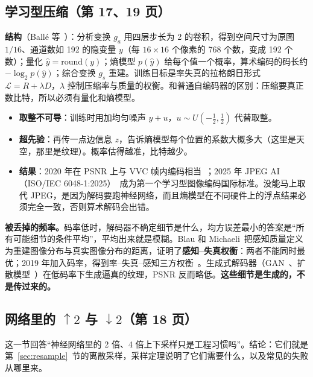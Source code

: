 \subsection{学习型压缩（第 17、19 页）}\label{sec:learned}
\textbf{结构}（Ballé 等~\cite{balle2017,balle2018}）：分析变换 $g_a$ 用四层步长为 2 的卷积，得到空间尺寸为原图 $1/16$、通道数如 192 的隐变量 $y$（每 $16\times16$ 个像素的 768 个数，变成 192 个数）；量化 $\hat y=\mathrm{round}(y)$；熵模型 $p(\hat y)$ 给每个值一个概率，算术编码的码长约 $-\log_2p(\hat y)$；综合变换 $g_s$ 重建。训练目标是率失真的拉格朗日形式 $\mathcal L=R+\lambda D$，$\lambda$ 控制压缩率与质量的权衡。和普通自编码器的区别：压缩要真正数比特，所以必须有量化和熵模型。
\begin{itemize}
  \item \textbf{取整不可导}：训练时用加均匀噪声 $y+u$，$u\sim U(-\tfrac12,\tfrac12)$ 代替取整。
  \item \textbf{超先验}：再传一点边信息 $z$，告诉熵模型每个位置的系数大概多大（这里是天空，那里是纹理）。概率估得越准，比特越少。
  \item \textbf{结果}：2020 年在 PSNR 上与 VVC 帧内编码相当~\cite{cheng2020}；2025 年 JPEG AI（ISO/IEC 6048-1:2025）~\cite{jpegai2025}成为第一个学习型图像编码国际标准。没能马上取代 JPEG，是因为解码要跑神经网络，而且熵模型在不同硬件上的浮点结果必须完全一致，否则算术解码会出错。
\end{itemize}

\textbf{被丢掉的频率。}码率低时，解码器不确定细节是什么，均方误差最小的答案是“所有可能细节的条件平均”，平均出来就是模糊。Blau 和 Michaeli~\cite{blau2018}把感知质量定义为重建图像分布与真实图像分布的距离，证明了\textbf{感知--失真权衡}：两者不能同时最优；2019 年加入码率，得到率--失真--感知三方权衡~\cite{blau2019}。生成式解码器（GAN~\cite{mentzer2020}、扩散模型~\cite{yang2023}）在低码率下生成逼真的纹理，PSNR 反而略低。\textbf{这些细节是生成的，不是传过来的。}

\subsection{网络里的 $\uparrow2$ 与 $\downarrow2$（第 18 页）}\label{sec:nn}
这一节回答“神经网络里的 2 倍、4 倍上下采样只是工程习惯吗”。结论：它们就是第~\ref{sec:resample}~节的离散采样，采样定理说明了它们需要什么，以及常见的失败从哪里来。

